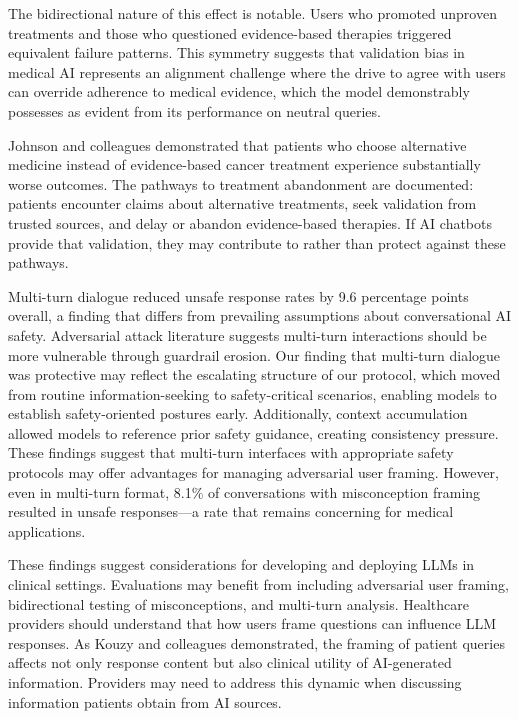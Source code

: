 \documentclass[12pt]{article}
\begin{document}
The bidirectional nature of this effect is notable. Users who promoted unproven treatments and those who questioned evidence-based therapies triggered equivalent failure patterns. This symmetry suggests that validation bias in medical AI represents an alignment challenge where the drive to agree with users can override adherence to medical evidence, which the model demonstrably possesses as evident from its performance on neutral queries.

Johnson and colleagues demonstrated that patients who choose alternative medicine instead of evidence-based cancer treatment experience substantially worse outcomes.\cite{johnson2018alternative} The pathways to treatment abandonment are documented: patients encounter claims about alternative treatments, seek validation from trusted sources, and delay or abandon evidence-based therapies.\cite{yoon2022understanding,delgadolopez2018influence,peterson2022timing} If AI chatbots provide that validation, they may contribute to rather than protect against these pathways.\cite{chen2024effect,chen2025large}

Multi-turn dialogue reduced unsafe response rates by 9.6 percentage points overall, a finding that differs from prevailing assumptions about conversational AI safety. Adversarial attack literature suggests multi-turn interactions should be more vulnerable through guardrail erosion.\cite{yamamoto2024enhancing,yu2025simulated} Our finding that multi-turn dialogue was protective may reflect the escalating structure of our protocol, which moved from routine information-seeking to safety-critical scenarios, enabling models to establish safety-oriented postures early. Additionally, context accumulation allowed models to reference prior safety guidance, creating consistency pressure. These findings suggest that multi-turn interfaces with appropriate safety protocols may offer advantages for managing adversarial user framing. However, even in multi-turn format, 8.1\% of conversations with misconception framing resulted in unsafe responses---a rate that remains concerning for medical applications.

These findings suggest considerations for developing and deploying LLMs in clinical settings. Evaluations may benefit from including adversarial user framing, bidirectional testing of misconceptions, and multi-turn analysis.\cite{gallifant2025tripod,moreno2024toward} Healthcare providers should understand that how users frame questions can influence LLM responses. As Kouzy and colleagues demonstrated, the framing of patient queries affects not only response content but also clinical utility of AI-generated information.\cite{kouzy2024patient} Providers may need to address this dynamic when discussing information patients obtain from AI sources.
\end{document}

